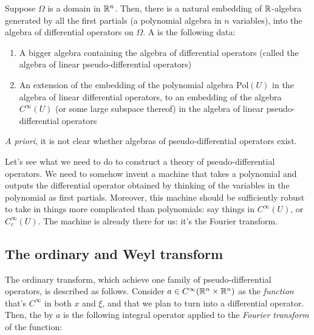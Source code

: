\documentclass[a4paper]{amsart}
\newcommand{\poly}[1]{\text{Pol}\left(#1\right)}
\begin{document}
\begin{definer}
  Suppose $\Omega$ is a domain in $\mathbb{R}^n$. Then, there is a natural
  embedding of $\mathbb{R}$-algebra generated by all the first partials (a
  polynomial algebra in $n$ variables), into the algebra of
  differential operators on $\Omega$. A  is the following data:

  \begin{enumerate}

  \item A bigger algebra containing the algebra of differential
    operators (called the algebra of linear pseudo-differential operators)

  \item An extension of the embedding of the polynomial algebra
    $\poly{U}$ in the algebra of linear differential operators, to an
    embedding of the algebra $C^\infty(U)$ (or some large subspace
    thereof) in the algebra of linear pseudo-differential operators

  \end{enumerate}
\end{definer}

{\em A priori}, it is not clear whether algebras of
pseudo-differential operators exist.

Let's see what we need to do to construct a theory of
pseudo-differential operators. We need to somehow invent a machine
that takes a polynomial and outputs the differential operator obtained
by thinking of the variables in the polynomial as first
partials. Moreover, this machine should be sufficiently robust to take
in things more complicated than polynomials: say things in
$C^\infty(U)$, or $C_c^\infty(U)$. The machine is already there for
us: it's the Fourier transform.

\subsection{The ordinary and Weyl transform}

The ordinary transform, which achieve one family of
pseudo-differential operators, is described as follows. Consider $a
\in C^\infty(\mathbb{R}^n \times \mathbb{R}^n)$ as the {\em function} that's
$C^\infty$ in both $x$ and $\xi$, and that we plan to turn into a
differential operator. Then, the  by
$a$ is the following integral operator applied to the {\em Fourier
  transform} of the function:
\end{document}
